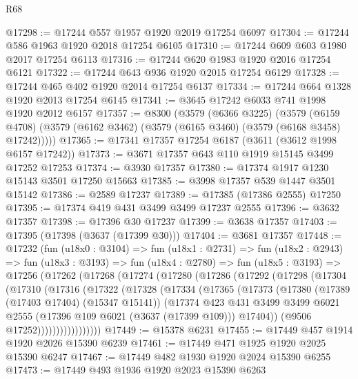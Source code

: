 \begin{lexlean}{R68}
\begin{coremodule}
@17298 := @17244 @557 @1957 @1920 @2019 @17254 @6097
@17304 := @17244 @586 @1963 @1920 @2018 @17254 @6105
@17310 := @17244 @609 @603 @1980 @2017 @17254 @6113
@17316 := @17244 @620 @1983 @1920 @2016 @17254 @6121
@17322 := @17244 @643 @936 @1920 @2015 @17254 @6129
@17328 := @17244 @465 @402 @1920 @2014 @17254 @6137
@17334 := @17244 @664 @1328 @1920 @2013 @17254 @6145
@17341 := @3645 @17242 @6033 @741 @1998 @1920 @2012 @6157
@17357 := @8300
    (@3579
      (@6366 @3225)
      (@3579
        (@6159 @4708)
        (@3579 (@6162 @3462) (@3579 (@6165 @3460) (@3579 (@6168 @3458) @17242)))))
@17365 := @17341 @17357 @17254 @6187 (@3611 (@3612 @1998 @6157 @17242))
@17373 := @3671 @17357 @643 @110 @1919 @15145 @3499 @17252 @17253
@17374 := @3930 @17357
@17380 := @17374 @1917 @1230 @15143 @3501 @17250 @15663
@17385 := @3998 @17357 @539 @1447 @3501 @15142
@17386 := @2589 @17237
@17389 := @17385 (@17386 @2555) @17250
@17395 := @17374 @419 @431 @3499 @3499 @17237 @2555
@17396 := @3632 @17357
@17398 := @17396 @30 @17237
@17399 := @3638 @17357
@17403 := @17395 (@17398 (@3637 (@17399 @30)))
@17404 := @3681 @17357
@17448 := @17232
    (fun (u18x0 : @3104) =>
    fun (u18x1 : @2731) =>
    fun (u18x2 : @2943) =>
    fun (u18x3 : @3193) =>
    fun (u18x4 : @2780) =>
    fun (u18x5 : @3193) =>
    @17256
      (@17262
        (@17268
          (@17274
            (@17280
              (@17286
                (@17292
                  (@17298
                    (@17304
                      (@17310
                        (@17316
                          (@17322
                            (@17328
                              (@17334
                                (@17365
                                  (@17373
                                    (@17380
                                      (@17389 (@17403 @17404) (@15347 @15141))
                                      (@17374
                                        @423
                                        @431
                                        @3499
                                        @3499
                                        @6021
                                        @2555
                                        (@17396 @109 @6021 (@3637 (@17399 @109)))
                                        @17404))
                                    (@9506 @17252)))))))))))))))))
@17449 := @15378 @6231
@17455 := @17449 @457 @1914 @1920 @2026 @15390 @6239
@17461 := @17449 @471 @1925 @1920 @2025 @15390 @6247
@17467 := @17449 @482 @1930 @1920 @2024 @15390 @6255
@17473 := @17449 @493 @1936 @1920 @2023 @15390 @6263

\end{coremodule}
\end{lexlean}

